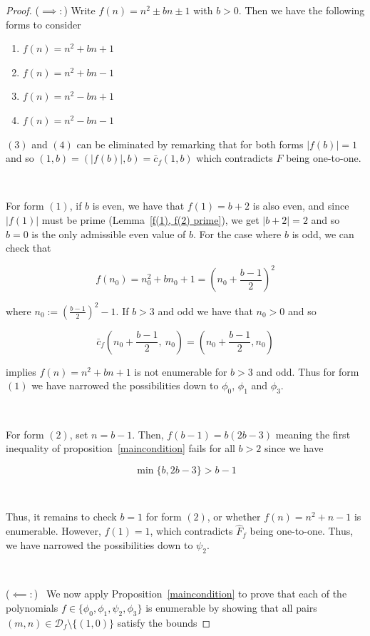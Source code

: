 \documentclass{article}
\begin{document}
\begin{proof}

($\implies:$)
Write $f(n) = n^2 \pm bn \pm 1$ with $b > 0$. Then we have the following forms to consider

\begin{enumerate}
    \item $f(n) = n^2 + bn + 1$
    \item $f(n) = n^2 + bn - 1$
    \item $f(n) = n^2 - bn + 1$
    \item $f(n) = n^2 - bn - 1$
\end{enumerate}

$(3)$ and $(4)$ can be eliminated by remarking that for both forms $|f(b)| = 1$ and so $(1, b) = (|f(b)|, b) 
= \bar{c}_f(1, b)$ which contradicts $F$ being one-to-one.

\

For form $(1)$, if $b$ is even, we have that $f(1) = b+2$ is also even, and since $|f(1)|$ must be prime (Lemma~\ref{f(1), f(2) prime}), we get $|b+2| = 2$ and so $b = 0$ is the only admissible even value of $b$. For the case where $b$ is odd, we can check that

$$f(n_0) = n_0^2 + bn_0 + 1 = (n_0 + \frac{b-1}{2})^2$$

where $n_0 := (\frac{b-1}{2})^2 - 1$. If $b > 3$ and odd we have that $n_0 > 0$ and so 

$$\bar{c}_f(n_0 + \frac{b-1}{2}, \ n_0) =  (n_0 + \frac{b-1}{2}, n_0)$$

implies $f(n) = n^2 + bn + 1$ is not enumerable for $b > 3$ and odd. Thus for form $(1)$ we have narrowed the possibilities down to $\phi_0$, $\phi_1$ and $\phi_3$.

\

For form $(2)$, set $n = b-1$. Then, $f(b-1) = b(2b-3)$ meaning the first inequality of proposition~\ref{maincondition} fails for all $b > 2$ since we have

$$\min \{b, 2b-3 \} > b-1$$

\

Thus, it remains to check $b=1$ for form $(2)$, or whether $f(n) = n^2 + n - 1$ is enumerable. However, $f(1) = 1$, which contradicts $\hat{F}_f$ being one-to-one. Thus, we have narrowed the possibilities down to $\psi_2$.

\

($\impliedby:$) \ We now apply Proposition~\ref{maincondition} to prove that each of the polynomials $f \in \{\phi_0, \phi_1, \psi_2, \phi_3\}$ is enumerable by showing that all pairs $(m, n) \in \mathcal{D}_f \setminus \{(1,0)\}$ satisfy the bounds


\end{proof}
\end{document}
